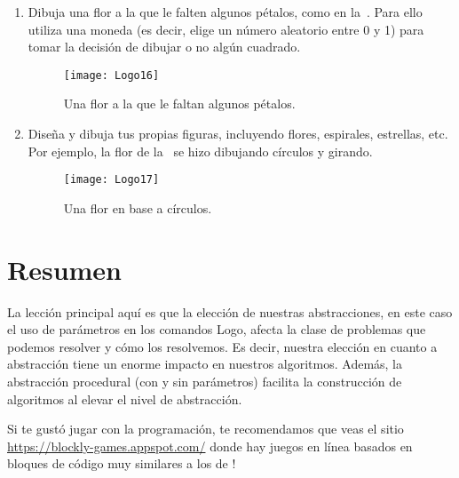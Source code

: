 \begin{enumerate}
\item Dibuja una flor a la que le falten algunos pétalos, como en la~. Para ello
  utiliza una moneda (es decir, elige un número aleatorio entre 0 y 1)
  para tomar la decisión de dibujar o no algún cuadrado.

\begin{figure}[H]
  \centering
  \texttt{[image: Logo16]}
  \caption{Una flor a la que le faltan algunos pétalos.}
  \label{fig:Logo16}
\end{figure}

\item Diseña y dibuja tus propias figuras, incluyendo flores,
  espirales, estrellas, etc. Por ejemplo, la flor de
  la~ se hizo dibujando círculos y girando.

\begin{figure}[H]
  \centering
  \texttt{[image: Logo17]}
  \caption{Una flor en base a círculos.}
  \label{fig:Logo17}
\end{figure}

\end{enumerate}

\section*{Resumen}

La lección principal aquí es que la elección de nuestras
abstracciones, en este caso el uso de parámetros en los comandos Logo,
afecta la clase de problemas que podemos resolver y cómo los
resolvemos. Es decir, nuestra elección en cuanto a abstracción tiene
un enorme impacto en nuestros algoritmos. Además, la abstracción
procedural (con y sin parámetros) facilita la construcción de
algoritmos al elevar el nivel de abstracción.

Si te gustó jugar con la programación, te recomendamos que veas el
sitio \url{https://blockly-games.appspot.com/} donde hay juegos en
línea basados en bloques de código muy similares a los de \AppInventor!










